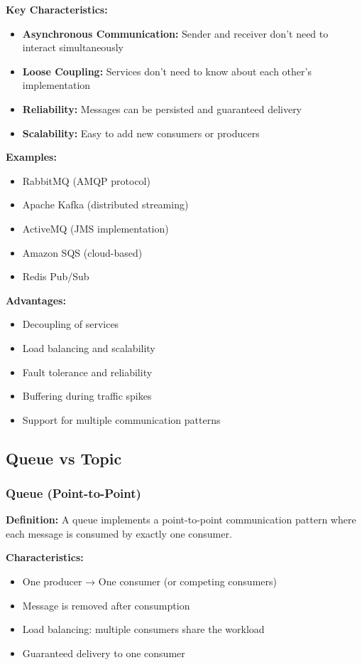 \documentclass[12pt,a4paper]{article}
\begin{document}
\textbf{Key Characteristics:}
\begin{itemize}
    \item \textbf{Asynchronous Communication:} Sender and receiver don't need to interact simultaneously
    \item \textbf{Loose Coupling:} Services don't need to know about each other's implementation
    \item \textbf{Reliability:} Messages can be persisted and guaranteed delivery
    \item \textbf{Scalability:} Easy to add new consumers or producers
\end{itemize}

\textbf{Examples:}
\begin{itemize}
    \item RabbitMQ (AMQP protocol)
    \item Apache Kafka (distributed streaming)
    \item ActiveMQ (JMS implementation)
    \item Amazon SQS (cloud-based)
    \item Redis Pub/Sub
\end{itemize}

\textbf{Advantages:}
\begin{itemize}
    \item Decoupling of services
    \item Load balancing and scalability
    \item Fault tolerance and reliability
    \item Buffering during traffic spikes
    \item Support for multiple communication patterns
\end{itemize}


\subsection{Queue vs Topic}

\subsubsection{Queue (Point-to-Point)}

\textbf{Definition:} A queue implements a point-to-point communication pattern where each message is consumed by exactly one consumer.

\textbf{Characteristics:}
\begin{itemize}
    \item One producer → One consumer (or competing consumers)
    \item Message is removed after consumption
    \item Load balancing: multiple consumers share the workload
    \item Guaranteed delivery to one consumer
\end{itemize}
\end{document}
